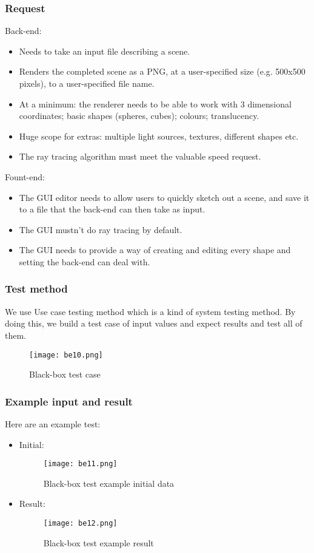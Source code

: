 \documentclass[11pt]{article}
\begin{document}
\subsubsection{Request}
Back-end:
\begin{itemize}
\item
Needs to take an input file describing a scene.
\item
Renders the completed scene as a PNG, at a user-specified size (e.g. 500x500 pixels), to a user-specified file name. 
\item
At a minimum: the renderer needs to be able to work with 3 dimensional coordinates; basic shapes (spheres, cubes); colours; translucency.
\item
Huge scope for extras: multiple light sources, textures, different shapes etc. 
\item
The ray tracing algorithm must meet the valuable speed request.
\end{itemize}
Fount-end:
\begin{itemize}
\item
The GUI editor needs to allow users to quickly sketch out a scene, and save it to a file that the back-end can then take as input.
\item
The GUI mustn’t do ray tracing by default.
\item
The GUI needs to provide a way of creating and editing every shape and setting the back-end can deal with.
\end{itemize}

\subsubsection{Test method}
We use Use case testing method which is a kind of system testing method. By doing this, we build a test case of input values and expect results and test all of them.

\begin{figure}[H]
\centering
\texttt{[image: be10.png]}
\caption{Black-box test case}
\label{fig:label}
\end{figure}

\subsubsection{Example input and result}
Here are an example test:
\begin{itemize}
\item
Initial:
\begin{figure}[H]
\centering
\texttt{[image: be11.png]}
\caption{Black-box test example initial data}
\label{fig:label}
\end{figure}

\item
Result:
\begin{figure}[H]
\centering
\texttt{[image: be12.png]}
\caption{Black-box test example result}
\label{fig:label}
\end{figure}

\end{itemize}
\end{document}

